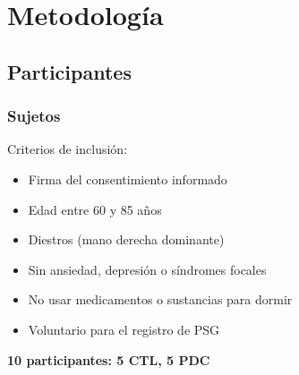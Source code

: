 \documentclass[serif,mathserif,professionalfont]{beamer}
\begin{document}

\section{Metodolog\'ia}


\subsection{Participantes}


\begin{frame}\frametitle{Sujetos}
Criterios de inclusi\'on:
\begin{itemize}
\item Firma del consentimiento informado
\item Edad entre 60 y 85 a\~nos
\item Diestros (mano derecha dominante)
\item Sin ansiedad, depresi\'on o s\'indromes focales
\item No usar medicamentos o sustancias para dormir
\item Voluntario para el registro de PSG
\end{itemize}

\textbf{10 participantes: 5 CTL, 5 PDC}
\end{frame}

\end{document}
